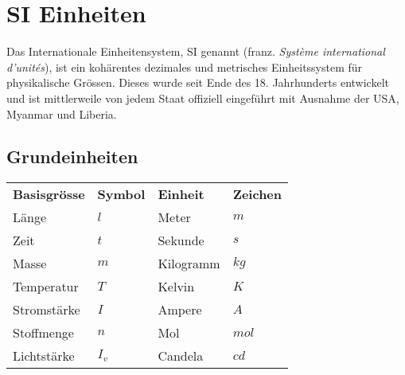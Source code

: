 



\chapter{SI Einheiten}

Das Internationale Einheitensystem, SI genannt 
(franz. \textit{Système international d'unités}),
ist ein kohärentes dezimales und metrisches Einheitssystem für 
physikalische Grössen. Dieses wurde seit Ende des 18. Jahrhunderts
entwickelt und ist mittlerweile von jedem Staat offiziell eingeführt mit 
Ausnahme der USA, Myanmar und Liberia.

\newpage
\section{Grundeinheiten}
\begin{footnotesize}
\begin{tabular}{llll}
  \rowcolor{white} \textbf{Basisgrösse} & \textbf{Symbol} 
                    & \textbf{Einheit} & \textbf{Zeichen}\\
  \rowcolor{lgray} Länge       & $l$   & Meter     & $m$\\
  \rowcolor{white} Zeit        & $t$   & Sekunde   & $s$\\
  \rowcolor{lgray} Masse       & $m$   & Kilogramm & $kg$\\
  \rowcolor{white} Temperatur  & $T$   & Kelvin    & $K$\\
  \rowcolor{lgray} Stromstärke & $I$   & Ampere    & $A$\\
  \rowcolor{white} Stoffmenge  & $n$   & Mol       & $mol$\\
  \rowcolor{lgray} Lichtstärke & $I_v$ & Candela   & $cd$\\
\end{tabular}
\end{footnotesize}

